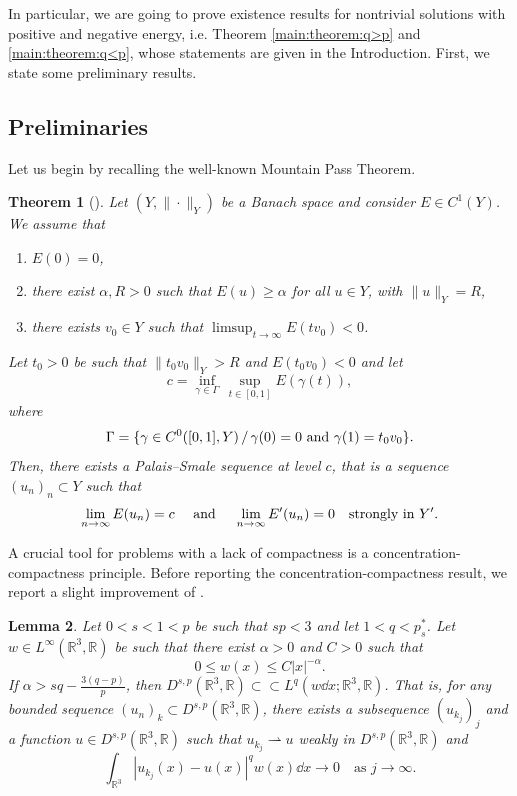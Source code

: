 \documentclass[leqno,11pt]{amsart}
\newcommand{\R}{\mathbb R}
\numberwithin{equation}{section}
\newtheorem{theorem}{Theorem}[section]
\newtheorem{lemma}[theorem]{Lemma}
\begin{document}
In particular, we are going to prove existence results for nontrivial solutions with positive and negative energy, i.e. Theorem \ref{main:theorem:q>p} and \ref{main:theorem:q<p}, whose statements are given in the Introduction. First, we state some preliminary results.



\subsection{Preliminaries}

Let us begin by recalling the well-known Mountain Pass Theorem.

\begin{theorem}[\cite{AmbrosettiRabinowitz}]\label{mpthm}
Let $(Y,\|\cdot\|_Y)$ be a Banach space and consider $E\in C^1(Y)$. We assume that
\begin{enumerate}[label=(\roman*)]
    \item $E(0)=0$,
    \item there exist $\alpha,R>0$ such that $E(u)\geq\alpha$ for all $u\in Y$, with $\|u\|_Y=R$,
    \item there exists $v_0\in Y$ such that $\limsup_{t\to \infty}E(tv_0)<0$.
\end{enumerate}
Let $t_0>0$ be such that $\|t_0v_0\|_Y>R$ and $E(t_0v_0)<0$
and let
$$c=\inf_{\gamma\in\Gamma}\,\sup_{t\in [0,1]}E(\gamma(t)),$$
where
$$\Gamma=\{\gamma\in C^0([0,1],Y)\,/\, \gamma(0)=0\hbox{ and }\gamma(1)=t_0v_0\}.$$
Then, there exists a Palais--Smale sequence at level $c$, that is
 a sequence $(u_n)_n\subset Y$ such that
$$\lim_{n\to \infty}E(u_n)=c\quad\hbox{ and }\quad\lim_{n\to \infty}E'(u_n)= 0\quad\hbox{strongly in }Y'.$$
\end{theorem}

A crucial tool for problems with a lack of compactness is a concentration-compactness principle.
Before reporting the concentration-compactness result, we report a slight improvement of \cite[Lemma 2.4]{BonderSaintierSilva}. 

\begin{lemma}
\label{BoSaSi:cpt:lemma}
Let $0 < s < 1 < p$ be such that $sp < 3$ and let $1< q < p^*_s$. Let $w \in L^\infty(\R^3,\R)$ be such that there exist $\alpha > 0$ and $C > 0$ such that
 $$0 \leq w(x) \leq C|x|^{-\alpha}.$$
If $\alpha > sq - \frac{3(q-p)}{p}$, then $D^{s,p}(\R^3,\R) \subset \subset L^q(w \dd x; \R^3,\R)$. That is, for any bounded sequence $(u_n)_k \subset D^{s,p}(\R^3,\R)$, there exists a subsequence $(u_{k_j})_j$ and a function $u \in D^{s,p}(\R^3,\R)$ such that $u_{k_j} \rightharpoonup u$ weakly in $D^{s,p}(\R^3,\R)$ and
\begin{equation}\label{strongconvpesata}
\int_{\R^3} |u_{k_j}(x) - u(x)|^q w(x) \dd x \to 0 \quad \text{as } j \to \infty.
\end{equation}
\end{lemma}
\end{document}
